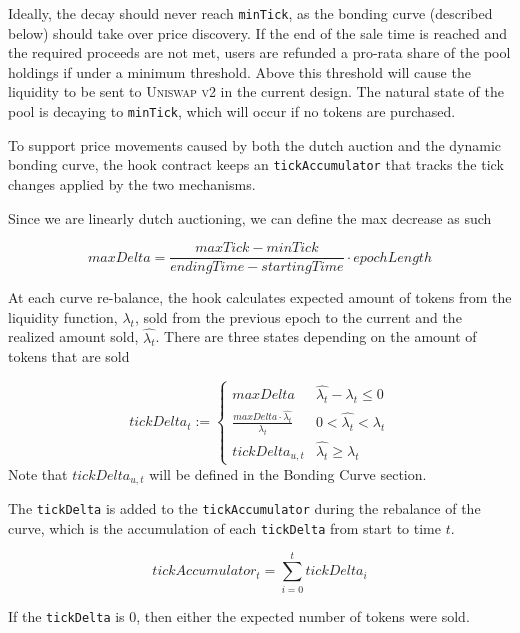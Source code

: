 \documentclass[sigconf,nonacm,prologue,table]{acmart}
\numberwithin{equation}{section}
\theoremstyle{definition}
\theoremstyle{remark}
\begin{document}
Ideally, the decay should never reach \verb|minTick|, as the bonding curve (described below) should take over price discovery. If the end of the sale time is reached and the required proceeds are not met, users are refunded a pro-rata share of the pool holdings if under a minimum threshold. Above this threshold will cause the liquidity to be sent to \textsc{Uniswap v2} in the current design. The natural state of the pool is decaying to \verb|minTick|, which will occur if no tokens are purchased.

To support price movements caused by both the dutch auction and the dynamic bonding curve, the hook contract keeps an \verb|tickAccumulator| that tracks the tick changes applied by the two mechanisms.

Since we are linearly dutch auctioning, we can define the max decrease as such

\begin{equation}
    maxDelta = \frac{maxTick - minTick}{endingTime - startingTime} \cdot epochLength
\end{equation}

At each curve re-balance, the hook calculates expected amount of tokens from the liquidity function, $\lambda_t$, sold from the previous epoch to the current and the realized amount sold, $\hat{\lambda_t}$. There are three states depending on the amount of tokens that are sold

\begin{equation}
    tickDelta_t := \begin{cases} 
          maxDelta & \hat{\lambda_t} - \lambda_t \leq 0 \\
          \frac{maxDelta \cdot \hat{\lambda_t}}{\lambda_t} & 0 < \hat{\lambda_t} < \lambda_t \\
          tickDelta_{u,t} & \hat{\lambda_t} \geq \lambda_t
       \end{cases} 
\end{equation}
Note that $tickDelta_{u,t}$ will be defined in the Bonding Curve section. 

The \verb|tickDelta| is added to the \verb|tickAccumulator| during the rebalance of the curve, which is the accumulation of each \verb|tickDelta| from start to time $t$.

\begin{equation}
    tickAccumulator_t = \sum^t_{i=0} tickDelta_i 
\end{equation}

If the \verb|tickDelta| is 0, then either the expected number of tokens were sold.
\end{document}
